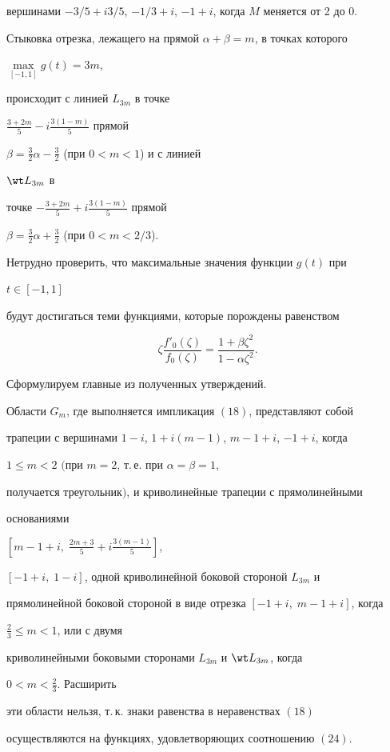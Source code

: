 вершинами $-3/5+i3/5$, $-1/3+i$, $-1+i$, когда $M$ меняется от 2 до 0.





Стыковка отрезка, лежащего на прямой $\alpha+\beta=m$, в точках которого


$\max\limits_{[-1,1]}g(t)=3m$,


происходит с линией $L_{3m}$ в точке


$\frac{3+2m}{5}-i\frac{3(1-m)}{5}$ прямой


$\beta=\frac{3}{2}\alpha-\frac{3}{2}$ (при $0<m<1$) и с линией


$\wt L_{3m}$ в


точке $-\frac{3+2m}{5}+i\frac{3(1-m)}{5}$ прямой


$\beta=\frac{3}{2}\alpha+\frac{3}{2}$ (при $0<m<2/3$).





Нетрудно проверить, что максимальные значения функции $g(t)$ при


$t\in[-1,1]$


будут достигаться теми функциями, которые порождены равенством


\begin{equation}


\zeta\frac{f'_0(\zeta)}{f_0(\zeta)}=


\frac{1+\beta\zeta^2}{1-\alpha\zeta^2}.


\end{equation}





Сформулируем главные из полученных утверждений.





\begin{thm}


Области $G_m$, где выполняется импликация $(18)$, представляют собой


трапеции с вершинами $1-i$, $1+i(m-1)$, $m-1+i$, $-1+i$, когда


$1\le m<2$ $($при $m=2$, т.\,е. при $\alpha=\beta=1$,


получается треугольник$)$, и криволинейные трапеции с прямолинейными


основаниями


$\left[m-1+i,\;\frac{2m+3}{5}+i\frac{3(m-1)}{5}\right]$,


$[-1+i,\;1-i]$, одной криволинейной боковой стороной $L_{3m}$ и


прямолинейной боковой стороной в виде отрезка $[-1+i,\;m-1+i]$, когда


$\frac{2}{3}\le m<1$, или с двумя


криволинейными боковыми сторонами $L_{3m}$ и $\wt L_{3m}$, когда


$0<m<\frac{2}{3}$. Расширить


эти области нельзя, т.\,к. знаки равенства в неравенствах $(18)$


осуществляются на функциях, удовлетворяющих соотношению $(24)$.


\end{thm}





